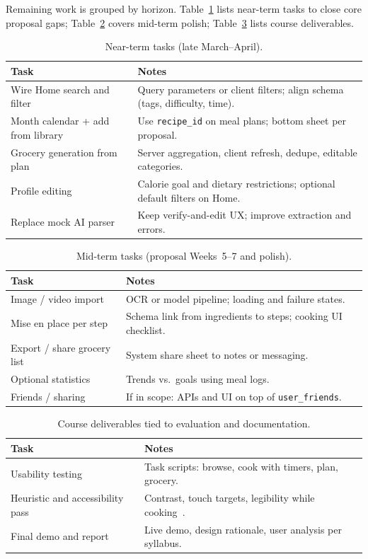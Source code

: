Remaining work is grouped by horizon. Table~\ref{tab:near} lists near-term tasks to close core proposal gaps; Table~\ref{tab:mid} covers mid-term polish; Table~\ref{tab:course} lists course deliverables.

\begin{table}[!t]
\centering
\caption{Near-term tasks (late March--April).}
\label{tab:near}
\begin{tabular}{@{}p{}p{}@{}}
\toprule
\textbf{Task} & \textbf{Notes} \\
\midrule
Wire Home search and filter & Query parameters or client filters; align schema (tags, difficulty, time). \\
Month calendar + add from library & Use \texttt{recipe\_id} on meal plans; bottom sheet per proposal. \\
Grocery generation from plan & Server aggregation, client refresh, dedupe, editable categories. \\
Profile editing & Calorie goal and dietary restrictions; optional default filters on Home. \\
Replace mock AI parser & Keep verify-and-edit UX; improve extraction and errors. \\
\bottomrule
\end{tabular}
\end{table}

\begin{table}[!t]
\centering
\caption{Mid-term tasks (proposal Weeks~5--7 and polish).}
\label{tab:mid}
\begin{tabular}{@{}p{}p{}@{}}
\toprule
\textbf{Task} & \textbf{Notes} \\
\midrule
Image / video import & OCR or model pipeline; loading and failure states. \\
Mise en place per step & Schema link from ingredients to steps; cooking UI checklist. \\
Export / share grocery list & System share sheet to notes or messaging. \\
Optional statistics & Trends vs.\ goals using meal logs. \\
Friends / sharing & If in scope: APIs and UI on top of \texttt{user\_friends}. \\
\bottomrule
\end{tabular}
\end{table}

\begin{table}[!t]
\centering
\caption{Course deliverables tied to evaluation and documentation.}
\label{tab:course}
\begin{tabular}{@{}p{}p{}@{}}
\toprule
\textbf{Task} & \textbf{Notes} \\
\midrule
Usability testing & Task scripts: browse, cook with timers, plan, grocery. \\
Heuristic and accessibility pass & Contrast, touch targets, legibility while cooking~\cite{wcag21}. \\
Final demo and report & Live demo, design rationale, user analysis per syllabus. \\
\bottomrule
\end{tabular}
\end{table}
